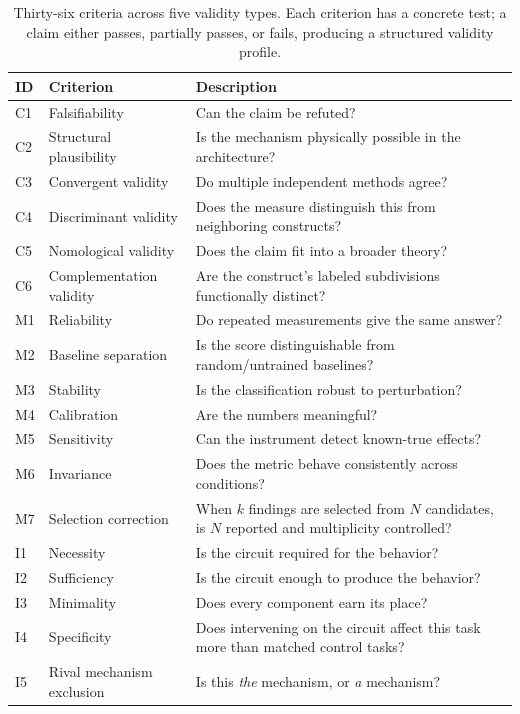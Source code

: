 \documentclass{article}
\begin{document}
\begingroup
{}
\begin{table}[H]
\centering
\small
\caption{Thirty-six criteria across five validity types. Each criterion has a concrete test; a claim either passes, partially passes, or fails, producing a structured validity profile.}
\label{tab:criteria}
\renewcommand{\arraystretch}{1.15}
\begin{tabular}{@{}llp{8.5cm}@{}}
\toprule
\textbf{ID} & \textbf{Criterion} & \textbf{Description} \\
\midrule
C1 & Falsifiability & Can the claim be refuted? \\
C2 & Structural plausibility & Is the mechanism physically possible in the architecture? \\
C3 & Convergent validity & Do multiple independent methods agree? \\
C4 & Discriminant validity & Does the measure distinguish this from neighboring constructs? \\
C5 & Nomological validity & Does the claim fit into a broader theory? \\
C6 & Complementation validity & Are the construct's labeled subdivisions functionally distinct? \\
\midrule
M1 & Reliability & Do repeated measurements give the same answer? \\
M2 & Baseline separation & Is the score distinguishable from random/untrained baselines? \\
M3 & Stability & Is the classification robust to perturbation? \\
M4 & Calibration & Are the numbers meaningful? \\
M5 & Sensitivity & Can the instrument detect known-true effects? \\
M6 & Invariance & Does the metric behave consistently across conditions? \\
M7 & Selection correction & When $k$ findings are selected from $N$ candidates, is $N$ reported and multiplicity controlled? \\
\midrule
I1 & Necessity & Is the circuit required for the behavior? \\
I2 & Sufficiency & Is the circuit enough to produce the behavior? \\
I3 & Minimality & Does every component earn its place? \\
I4 & Specificity & Does intervening on the circuit affect this task more than matched control tasks? \\
I5 & Rival mechanism exclusion & Is this \emph{the} mechanism, or \emph{a} mechanism? \\

\end{tabular}
\end{table}
\end{document}
